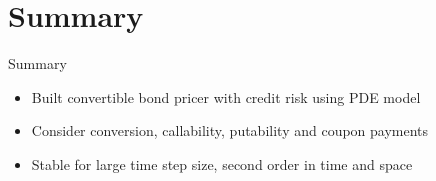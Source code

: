\documentclass{beamer}
\begin{document}
\section{Summary}

\begin{frame}{Summary}{}
\begin{itemize}
	\item Built convertible bond pricer with credit risk using PDE model
	\item Consider conversion, callability, putability and coupon payments
	\item Stable for large time step size, second order in time and space
\end{itemize}
\end{frame}
\end{document}
